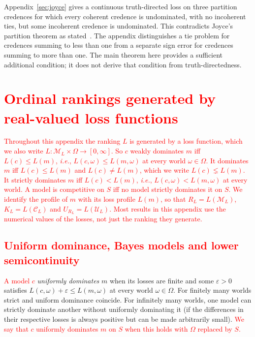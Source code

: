 \documentclass[11pt]{article}
\theoremstyle{definition}
\theoremstyle{remark}
\newcommand{\M}{\mathcal M}
\newcommand{\C}{\mathcal C}
\newcommand{\U}{\mathcal U}
\begin{document}
Appendix~\ref{sec:joyce} gives a continuous truth-directed loss on three partition credences for which every coherent credence is undominated, with no incoherent ties, but some incoherent credence is undominated. This contradicts Joyce's partition theorem as stated~\cite[Theorem~2]{Joyce}. The appendix distinguishes a tie problem for credences summing to less than one from a separate sign error for credences summing to more than one. The main theorem here provides a sufficient additional condition; it does not derive that condition from truth-directedness.


\appendix
\section{\textcolor{red}{Ordinal rankings generated by real-valued loss functions}}\label{sec:real}
\textcolor{red}{Throughout this appendix the ranking $L$ is generated by a loss function, which we also write $L:\M_L\times\Omega\to[0,\infty]$. So $c$ weakly dominates $m$ iff $L(c)\le L(m)$, \textit{i.e.}, $L(c,\omega)\le L(m,\omega)$ at every world $\omega\in\Omega$. It dominates $m$ iff $L(c)\le L(m)$ and $L(c)\neq L(m)$, which we write $L(c)\lneq L(m)$. It strictly dominates $m$ iff $L(c)<L(m)$, \textit{i.e.}, $L(c,\omega)<L(m,\omega)$ at every world. A model is competitive on $S$ iff no model strictly dominates it on $S$. We identify the profile of $m$ with its loss profile $L(m)$, so that $R_L=L(\M_L)$, $K_L=L(\C_L)$ and $U_{R_L}=L(\U_L)$. Most results in this appendix use the numerical values of the losses, not just the ranking they generate.}

\subsection{\textcolor{red}{Uniform dominance, Bayes models and lower semicontinuity}}\label{sec:ordinal}
\textcolor{red}{A model $c$} \emph{uniformly dominates} $m$ when its losses are finite and some $\varepsilon>0$ satisfies $L(c,\omega)+\varepsilon\le L(m,\omega)$ at every world $\omega\in\Omega$. For finitely many worlds strict and uniform dominance coincide. For infinitely many worlds, one model can strictly dominate another without uniformly dominating it (if the differences in their respective losses is always positive but can be made arbitrarily small). \textcolor{red}{We say that $c$ uniformly dominates $m$ on $S$ when this holds with $\Omega$ replaced by $S$.}
\end{document}
